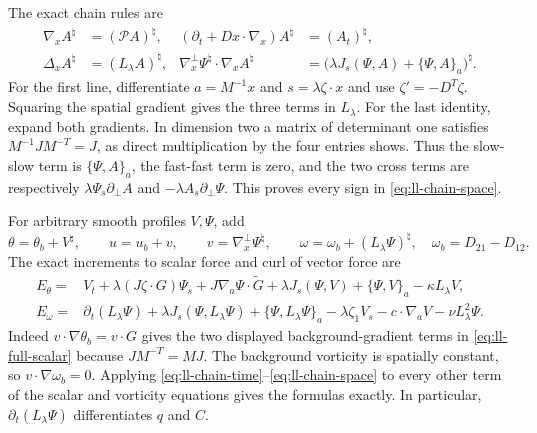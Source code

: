 The exact chain rules are
\begin{align}
\nabla_xA^\natural&=(\mathcal PA)^\natural,&
(\partial_t+Dx\cdot\nabla_x)A^\natural&=(A_t)^\natural,
\label{eq:ll-chain-time}\\
\Delta_xA^\natural&=(L_\lambda A)^\natural,&
\nabla_x^\perp\Psi^\natural\cdot\nabla_xA^\natural
&=\bigl(\lambda J_s(\Psi,A)+\{\Psi,A\}_a\bigr)^\natural.
\label{eq:ll-chain-space}
\end{align}
For the first line, differentiate $a=M^{-1}x$ and
$s=\lambda\zeta\cdot x$ and use $\zeta'=-D^T\zeta$.
Squaring the spatial gradient gives the three terms in $L_\lambda$.
For the last identity, expand both gradients. In dimension two a
matrix of determinant one satisfies $M^{-1}JM^{-T}=J$, as direct
multiplication by the four entries shows. Thus the slow-slow term is
$\{\Psi,A\}_a$, the fast-fast term is zero, and the two cross terms
are respectively $\lambda\Psi_s\partial_\perp A$ and
$-\lambda A_s\partial_\perp\Psi$. This proves every sign in
\eqref{eq:ll-chain-space}.

For arbitrary smooth profiles $V,\Psi$, add
\[
\theta=\theta_b+V^\natural,\qquad
u=u_b+v,\qquad v=\nabla_x^\perp\Psi^\natural,
\qquad \omega=\omega_b+(L_\lambda\Psi)^\natural,
\quad \omega_b=D_{21}-D_{12}.
\]
The exact increments to scalar force and curl of vector force are
\begin{align}
E_\theta={}&V_t+\lambda(J\zeta\cdot G)\Psi_s
 +J\nabla_a\Psi\cdot\widetilde G
 +\lambda J_s(\Psi,V)+\{\Psi,V\}_a-\kappa L_\lambda V,
\label{eq:ll-full-scalar}\\
E_\omega={}&\partial_t(L_\lambda\Psi)
 +\lambda J_s(\Psi,L_\lambda\Psi)+\{\Psi,L_\lambda\Psi\}_a
 -\lambda\zeta_1V_s-c\cdot\nabla_aV-\nu L_\lambda^2\Psi.
\label{eq:ll-full-vorticity}
\end{align}
Indeed $v\cdot\nabla\theta_b=v\cdot G$ gives the two displayed
background-gradient terms in \eqref{eq:ll-full-scalar} because
$JM^{-T}=MJ$. The background vorticity is spatially constant, so
$v\cdot\nabla\omega_b=0$. Applying
\eqref{eq:ll-chain-time}--\eqref{eq:ll-chain-space} to every other
term of the scalar and vorticity equations gives the formulas exactly.
In particular, $\partial_t(L_\lambda\Psi)$ differentiates $q$ and $C$.

